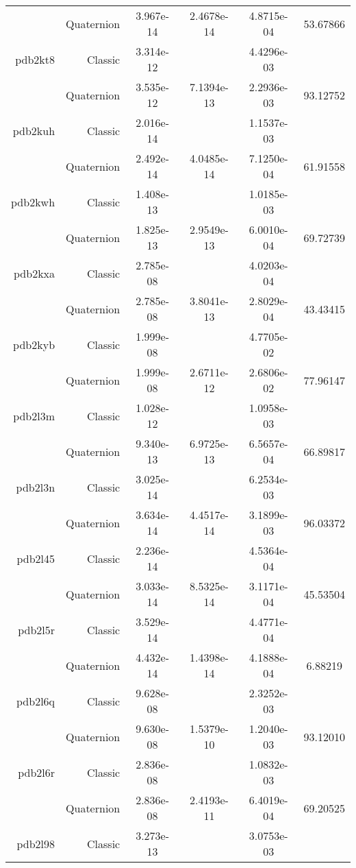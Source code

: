 \begin{xltabular}{\textwidth}{r|rS[table-format=1.3e+2]S[table-format=1.4e+2]S[table-format=1.4e+2]S[table-format=-1.5]}
& Quaternion & 3.967e-14 & 2.4678e-14 & 4.8715e-04 & 53.67866\\  \addlinespace
pdb2kt8 & Classic & 3.314e-12 &  & 4.4296e-03 & \\
& Quaternion & 3.535e-12 & 7.1394e-13 & 2.2936e-03 & 93.12752\\  \addlinespace
pdb2kuh & Classic & 2.016e-14 &  & 1.1537e-03 & \\
& Quaternion & 2.492e-14 & 4.0485e-14 & 7.1250e-04 & 61.91558\\  \addlinespace
pdb2kwh & Classic & 1.408e-13 &  & 1.0185e-03 & \\
& Quaternion & 1.825e-13 & 2.9549e-13 & 6.0010e-04 & 69.72739\\  \addlinespace
pdb2kxa & Classic & 2.785e-08 &  & 4.0203e-04 & \\
& Quaternion & 2.785e-08 & 3.8041e-13 & 2.8029e-04 & 43.43415\\  \addlinespace
pdb2kyb & Classic & 1.999e-08 &  & 4.7705e-02 & \\
& Quaternion & 1.999e-08 & 2.6711e-12 & 2.6806e-02 & 77.96147\\  \addlinespace
pdb2l3m & Classic & 1.028e-12 &  & 1.0958e-03 & \\
& Quaternion & 9.340e-13 & 6.9725e-13 & 6.5657e-04 & 66.89817\\  \addlinespace
pdb2l3n & Classic & 3.025e-14 &  & 6.2534e-03 & \\
& Quaternion & 3.634e-14 & 4.4517e-14 & 3.1899e-03 & 96.03372\\  \addlinespace
pdb2l45 & Classic & 2.236e-14 &  & 4.5364e-04 & \\
& Quaternion & 3.033e-14 & 8.5325e-14 & 3.1171e-04 & 45.53504\\  \addlinespace
pdb2l5r & Classic & 3.529e-14 &  & 4.4771e-04 & \\
& Quaternion & 4.432e-14 & 1.4398e-14 & 4.1888e-04 & 6.88219\\  \addlinespace
pdb2l6q & Classic & 9.628e-08 &  & 2.3252e-03 & \\
& Quaternion & 9.630e-08 & 1.5379e-10 & 1.2040e-03 & 93.12010\\  \addlinespace
pdb2l6r & Classic & 2.836e-08 &  & 1.0832e-03 & \\
& Quaternion & 2.836e-08 & 2.4193e-11 & 6.4019e-04 & 69.20525\\  \addlinespace
pdb2l98 & Classic & 3.273e-13 &  & 3.0753e-03 & \\

\end{xltabular}
